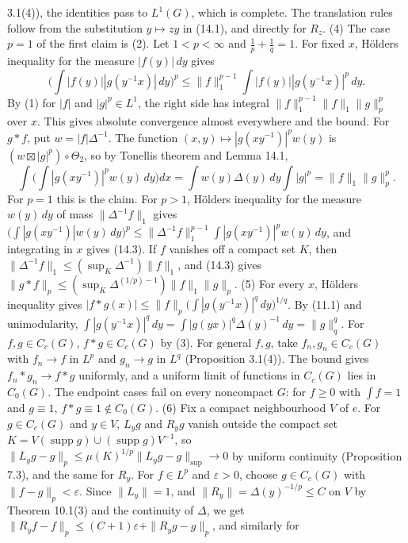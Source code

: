 \documentclass[
  english,
  11pt,
  a4paper,
]{article}
\begin{document}
3.1(4)), the identities pass to \(L^1(G)\), which is complete. The
translation rules follow from the substitution \(y\mapsto zy\) in
(14.1), and directly for \(R_z\). (4) The case \(p=1\) of the first
claim is (2). Let \(1<p<\infty\) and \(\frac1p+\frac1q=1\). For fixed
\(x\), Hölder\textquotesingle s inequality for the measure
\(|f(y)|\,dy\) gives
\[\Big(\int|f(y)||g(y^{-1}x)|\,dy\Big)^p\leq\|f\|_1^{p-1}\int|f(y)||g(y^{-1}x)|^p\,dy .\]
By (1) for \(|f|\) and \(|g|^p\in L^1\), the right side has integral
\(\|f\|_1^{p-1}\|f\|_1\|g\|_p^p\) over \(x\). This gives absolute
convergence almost everywhere and the bound. For \(g*f\), put
\(w=|f|\Delta^{-1}\). The function \((x,y)\mapsto|g(xy^{-1})|^pw(y)\) is
\((w\boxtimes|g|^p)\circ\Theta_2\), so by Tonelli\textquotesingle s
theorem and Lemma 14.1,
\[\int\Big(\int|g(xy^{-1})|^pw(y)\,dy\Big)dx=\int w(y)\Delta(y)\,dy\int|g|^p=\|f\|_1\|g\|_p^p .\]
For \(p=1\) this is the claim. For \(p>1\), Hölder\textquotesingle s
inequality for the measure \(w(y)\,dy\) of mass \(\|\Delta^{-1}f\|_1\)
gives
\(\big(\int|g(xy^{-1})|w(y)\,dy\big)^p\leq\|\Delta^{-1}f\|_1^{p-1}\int|g(xy^{-1})|^pw(y)\,dy\),
and integrating in \(x\) gives (14.3). If \(f\) vanishes off a compact
set \(K\), then \(\|\Delta^{-1}f\|_1\leq(\sup_K\Delta^{-1})\|f\|_1\),
and (14.3) gives
\(\|g*f\|_p\leq(\sup_K\Delta^{(1/p)-1})\|f\|_1\|g\|_p\). (5) For every
\(x\), Hölder\textquotesingle s inequality gives
\(|f*g(x)|\leq\|f\|_p\big(\int|g(y^{-1}x)|^q\,dy\big)^{1/q}\). By (11.1)
and unimodularity,
\(\int|g(y^{-1}x)|^q\,dy=\int|g(yx)|^q\Delta(y)^{-1}\,dy=\|g\|_q^q\).
For \(f,g\in C_c(G)\), \(f*g\in C_c(G)\) by (3). For general \(f,g\),
take \(f_n,g_n\in C_c(G)\) with \(f_n\to f\) in \(L^p\) and \(g_n\to g\)
in \(L^q\) (Proposition 3.1(4)). The bound gives \(f_n*g_n\to f*g\)
uniformly, and a uniform limit of functions in \(C_c(G)\) lies in
\(C_0(G)\). The endpoint cases fail on every noncompact \(G\): for
\(f\geq0\) with \(\int f=1\) and \(g\equiv1\),
\(f*g\equiv1\notin C_0(G)\). (6) Fix a compact neighbourhood \(V\) of
\(e\). For \(g\in C_c(G)\) and \(y\in V\), \(L_yg\) and \(R_yg\) vanish
outside the compact set
\(K=V(\operatorname{supp}g)\cup(\operatorname{supp}g)V^{-1}\), so
\(\|L_yg-g\|_p\leq\mu(K)^{1/p}\|L_yg-g\|_{\sup}\to0\) by uniform
continuity (Proposition 7.3), and the same for \(R_y\). For \(f\in L^p\)
and \(\varepsilon>0\), choose \(g\in C_c(G)\) with
\(\|f-g\|_p<\varepsilon\). Since \(\|L_y\|=1\), and
\(\|R_y\|=\Delta(y)^{-1/p}\leq C\) on \(V\) by Theorem 10.1(3) and the
continuity of \(\Delta\), we get
\(\|R_yf-f\|_p\leq(C+1)\varepsilon+\|R_yg-g\|_p\), and similarly for
\end{document}
